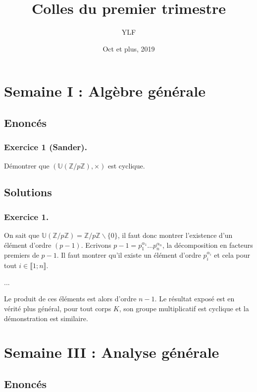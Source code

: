 \documentclass{article}
\begin{document}
\title{Colles du premier trimestre}
\author{YLF}
\date{Oct et plus, 2019}
\maketitle

\section{Semaine I : Algèbre générale}
\subsection*{Enoncés}
\subsubsection*{Exercice 1 (Sander).}
Démontrer que $(\mathbb{U}(\mathbb{Z}/p\mathbb{Z}), \times)$ est cyclique.
\subsection*{Solutions}
\subsubsection*{Exercice 1.}
On sait que $\mathbb{U}(\mathbb{Z}/p\mathbb{Z}) = \mathbb{Z}/p\mathbb{Z}\backslash\{0\}$, il faut donc montrer l'existence d'un élément d'ordre $(p-1)$. Ecrivons $p-1 = p_1^{\alpha_1}\ldots p_n^{\alpha_n}$, la décomposition en facteurs premiers de $p-1$. Il faut montrer qu'il existe un élément d'ordre $p_i^{\alpha_i}$ et cela pour tout $i\in\llbracket 1;n \rrbracket$.

...

Le produit de ces éléments est alors d'ordre $n-1$. Le résultat exposé est en vérité plus général, pour tout corps $K$, son groupe multiplicatif est cyclique et la démonstration est similaire.
\section{Semaine III : Analyse générale}
\subsection*{Enoncés}
\end{document}
